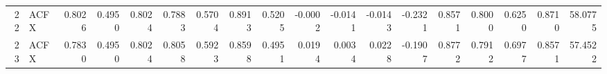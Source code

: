 \begin{tabular}{rlrrrrrrrrrrrrrrrr}
 22 &   ACFX &          0.8026 &  0.4950 &  0.8024 &   0.7883 &          0.5704 &      0.8913 &             0.5205 &                  -0.0002 &             -0.0141 &                   -0.0143 &                          -0.2321 &          0.8571 &         0.8000 &           0.6250 &            0.8710 &      58.0775 \\
 23 &   ACFX &          0.7830 &  0.4950 &  0.8024 &   0.8058 &          0.5923 &      0.8598 &             0.4951 &                   0.0194 &              0.0034 &                    0.0228 &                          -0.1907 &          0.8772 &         0.7912 &           0.6977 &            0.8571 &      57.4522 \\
\bottomrule
\end{tabular}
